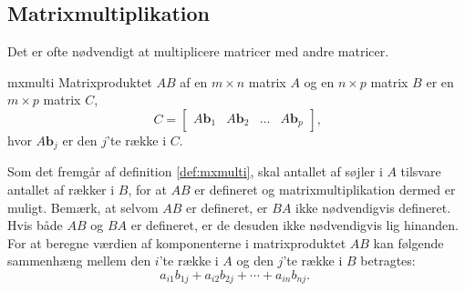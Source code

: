 \subsection{Matrixmultiplikation}

Det er ofte nødvendigt at multiplicere matricer med andre matricer. 
\begin{defn}{}{mxmulti}
Matrixproduktet $AB$ af en $m \times n$ matrix $A$ og en $n \times p$ matrix $B$ er en $m \times p$ matrix $C$, 
$$
C=
\begin{bmatrix}
A\textbf{b}_1 & A\textbf{b}_2 & \ldots & A\textbf{b}_p
\end{bmatrix}\text{,}
$$
hvor $A\textbf{b}_j$ er den $j$'te række i $C$.
\end{defn}
\noindent
%
Som det fremgår af definition \ref{def:mxmulti}, skal antallet af søjler i $A$ tilsvare antallet af rækker i $B$, for at $AB$ er defineret og matrixmultiplikation dermed er muligt. 
Bemærk, at selvom $AB$ er defineret, er $BA$ ikke nødvendigvis defineret. 
Hvis både $AB$ og $BA$ er defineret, er de desuden ikke nødvendigvis lig hinanden. 
For at beregne værdien af komponenterne i matrixproduktet $AB$ kan følgende sammenhæng mellem den $i$'te række i $A$ og den $j$'te række i $B$ betragtes: 
$$
a_{i1}b_{1j} + a_{i2}b_{2j} + \cdots + a_{in}b_{nj}
\text{. }$$
\\\\
%
